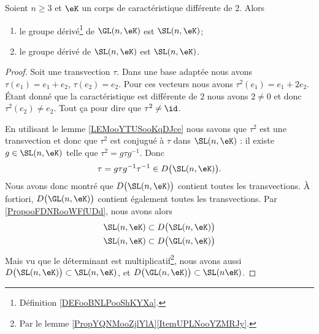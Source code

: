 \begin{proposition}      \label{PROPooSAOTooIlpJoY}
	Soient \( n\geq 3\) et \( \eK\) un corps de caractéristique différente de \( 2\). Alors
	\begin{enumerate}
		\item
		      le groupe dérivé\footnote{Définition \ref{DEFooBNLPooShKYXa}.} de \( \GL(n,\eK)\) est \( \SL(n,\eK)\);  
		\item
		      le groupe dérivé de \( \SL(n,\eK)\) est \( \SL(n,\eK)\).  
	\end{enumerate}
\end{proposition}

\begin{proof}
	Soit une transvection \( \tau\). Dans une base adaptée nous avons \( \tau(e_1)=e_1+e_2\), \( \tau(e_2)=e_2\). Pour ces vecteurs nous avons \( \tau^2(e_1)=e_1+2e_2\). Étant donné que la caractéristique est différente de \( 2\) nous avons \( 2\neq 0\) et donc \( \tau^2(e_2)\neq e_2\). Tout ça pour dire que \( \tau^2\neq \id\).

	En utilisant le lemme \ref{LEMooYTUSooKqDJce} nous savons que \( \tau^2\) est une transvection et donc que \( \tau^2\) est conjugué à \( \tau\) dans \( \SL(n,\eK)\) : il existe \( g\in \SL(n,\eK)\) telle que \( \tau^2=g\tau g^{-1}\). Donc
	\begin{equation}
		\tau=g\tau g^{-1}\tau^{-1}\in D\big( \SL(n,\eK) \big).
	\end{equation}
	Nous avons donc montré que \( D\big( \SL(n,\eK) \big)\) contient toutes les transvections. À fortiori, \( D\big( \GL(n,\eK) \big)\) contient également toutes les transvections. Par \ref{PropooFDNRooWFfUDd}, nous avons alors
	\begin{subequations}
		\begin{align}
			\SL(n,\eK) & \subset D\big( \SL(n,\eK) \big) \\
			\SL(n,\eK) & \subset D\big( \GL(n,\eK) \big)
		\end{align}
	\end{subequations}
	Mais vu que le déterminant est multiplicatif\footnote{Par le lemme \ref{PropYQNMooZjlYlA}\ref{ItemUPLNooYZMRJy}.}, nous avons aussi \( D\big( \SL(n,\eK) \big)\subset \SL(n,\eK)\), et \( D\big( \GL(n,\eK) \big)\subset\SL(n\eK)\).
\end{proof}

